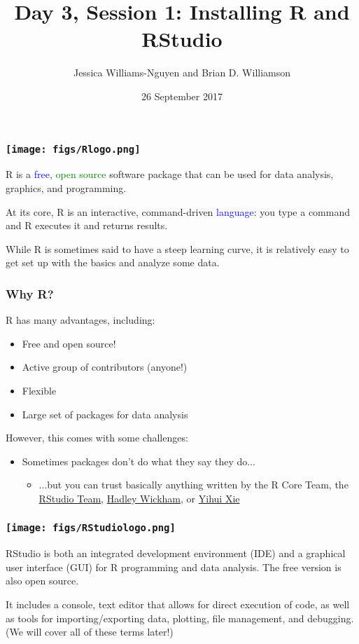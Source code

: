 \documentclass[11pt]{beamer}
\title{Day 3, Session 1: Installing R and RStudio}
\author{Jessica Williams-Nguyen and Brian D. Williamson}
\institute{EPI/BIOST Bootcamp 2017}
\date{26 September 2017}
\newcommand{\myframe}[1]{\begin{frame} \frametitle{#1}}
\newenvironment{spaceitemize}
{ \begin{itemize}
    \setlength{\itemsep}{10pt}
    \setlength{\parskip}{0pt}
    \setlength{\parsep}{0pt}     }
{ \end{itemize}                  }
\begin{document}
\begin{frame}
\titlepage
\end{frame}

\myframe{\texttt{[image: figs/Rlogo.png]}}
R is a \textcolor{blue}{free}, \textcolor{green}{open source} software package that can be used for data analysis, graphics, and programming. 

At its core, R is an interactive, command-driven \textcolor{blue}{language}: you type a command and R executes it and returns results. 

While R is sometimes said to have a steep learning curve, it is relatively easy to get set up with the basics and analyze some data.
\end{frame}

\myframe{Why R?}
R has many advantages, including:
\begin{spaceitemize}
\item Free and open source!
\item Active group of contributors (anyone!)
\item Flexible
\item Large set of packages for data analysis
\end{spaceitemize}

However, this comes with some challenges:
\begin{spaceitemize}
\item Sometimes packages don't do what they say they do...
\begin{itemize}
\item ...but you can trust basically anything written by the R Core Team, the \href{https://www.rstudio.com/products/rpackages/}{RStudio Team}, \href{http://hadley.nz/}{Hadley Wickham}, or \href{https://github.com/yihui}{Yihui Xie}
\end{itemize}
\end{spaceitemize}
\end{frame}


\myframe{\texttt{[image: figs/RStudiologo.png]}}
RStudio is both an integrated development environment (IDE) and a graphical user interface (GUI) for R programming and data analysis. The free version is also open source.

It includes a console, text editor that allows for direct execution of code, as well as tools for importing/exporting data, plotting, file management, and debugging. (We will cover all of these terms later!)
\end{frame}
\end{document}
